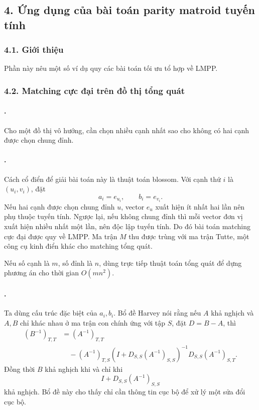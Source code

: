 \documentclass[11pt]{article}
\begin{document}
\subsection*{4. Ứng dụng của bài toán parity matroid tuyến tính}

\subsubsection*{4.1. Giới thiệu}

Phần này nêu một số ví dụ quy các bài toán tối ưu tổ hợp về LMPP.

\subsubsection*{4.2. Matching cực đại trên đồ thị tổng quát}

\paragraph{.}
Cho một đồ thị vô hướng, cần chọn nhiều cạnh nhất sao cho không có hai cạnh được
chọn chung đỉnh.

\paragraph{.}
Cách cổ điển để giải bài toán này là thuật toán blossom. Với cạnh thứ \(i\) là
\((u_i,v_i)\), đặt
\[
  a_i=e_{u_i},\qquad b_i=e_{v_i}.
\]
Nếu hai cạnh được chọn chung đỉnh \(u\), vector \(e_u\) xuất hiện ít nhất hai
lần nên phụ thuộc tuyến tính. Ngược lại, nếu không chung đỉnh thì mỗi vector
đơn vị xuất hiện nhiều nhất một lần, nên độc lập tuyến tính. Do đó bài toán
matching cực đại được quy về LMPP. Ma trận \(M\) thu được trùng với ma trận
Tutte, một công cụ kinh điển khác cho matching tổng quát.

Nếu số cạnh là \(m\), số đỉnh là \(n\), dùng trực tiếp thuật toán tổng quát để
dựng phương án cho thời gian \(O(mn^2)\).

\paragraph{.}
Ta dùng cấu trúc đặc biệt của \(a_i,b_i\). Bổ đề Harvey nói rằng nếu \(A\) khả
nghịch và \(A,B\) chỉ khác nhau ở ma trận con chính ứng với tập \(S\), đặt
\(D=B-A\), thì
\[
\begin{aligned}
  (B^{-1})_{T,T}
  &=(A^{-1})_{T,T}\\
  &\quad -(A^{-1})_{T,S}
  (I+D_{S,S}(A^{-1})_{S,S})^{-1}
  D_{S,S}(A^{-1})_{S,T}.
\end{aligned}
\]
Đồng thời \(B\) khả nghịch khi và chỉ khi
\[
  I+D_{S,S}(A^{-1})_{S,S}
\]
khả nghịch. Bổ đề này cho thấy chỉ cần thông tin cục bộ để xử lý một sửa đổi
cục bộ.
\end{document}

